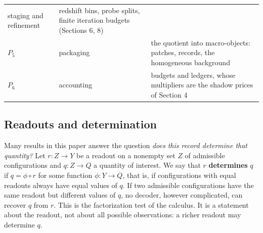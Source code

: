 \begin{longtable}[]{@{}lll@{}}
\begin{minipage}[t]{0.26\columnwidth}
staging and refinement\strut
\end{minipage} & \begin{minipage}[t]{0.60\columnwidth}\raggedright
redshift bins, probe splits, finite iteration budgets (Sections 6,
8)\strut
\end{minipage}\tabularnewline
\begin{minipage}[t]{0.05\columnwidth}\raggedright
\(P_5\)\strut
\end{minipage} & \begin{minipage}[t]{0.26\columnwidth}\raggedright
packaging\strut
\end{minipage} & \begin{minipage}[t]{0.60\columnwidth}\raggedright
the quotient into macro-objects: patches, records, the homogeneous
background\strut
\end{minipage}\tabularnewline
\begin{minipage}[t]{0.05\columnwidth}\raggedright
\(P_6\)\strut
\end{minipage} & \begin{minipage}[t]{0.26\columnwidth}\raggedright
accounting\strut
\end{minipage} & \begin{minipage}[t]{0.60\columnwidth}\raggedright
budgets and ledgers, whose multipliers are the shadow prices of Section
4\strut
\end{minipage}\tabularnewline
\bottomrule
\end{longtable}
\addtocounter{table}{-1}

\hypertarget{readouts-and-determination}{%
\subsection{Readouts and
determination}\label{readouts-and-determination}}

Many results in this paper answer the question \emph{does this record
determine that quantity?} Let \(r:Z\to Y\) be a readout on a nonempty
set \(Z\) of admissible configurations and \(q:Z\to Q\) a quantity of
interest. We say that \(r\) \textbf{determines} \(q\) if
\(q=\phi\circ r\) for some function \(\phi:Y\to Q\), that is, if
configurations with equal readouts always have equal values of \(q\). If
two admissible configurations have the same readout but different values
of \(q\), no decoder, however complicated, can recover \(q\) from \(r\).
This is the factorization test of the calculus. It is a statement about
the readout, not about all possible observations: a richer readout may
determine \(q\).

